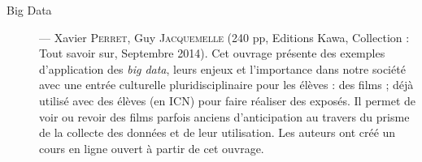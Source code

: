 \begin{description}
\item[Big Data] --- 
Xavier \textsc{Perret}, Guy \textsc{Jacquemelle} (240 pp, Editions Kawa, Collection : Tout savoir sur, Septembre 2014). Cet ouvrage présente des exemples d’application des \textit{big data}, leurs enjeux et l'importance dans notre société avec une entrée culturelle pluridisciplinaire pour les élèves : des films ; déjà utilisé avec des élèves (en ICN) pour faire réaliser des exposés. Il permet de voir ou revoir des films parfois anciens d’anticipation au travers du prisme de la collecte des données et de leur utilisation. Les auteurs ont créé un cours en ligne ouvert à partir de cet ouvrage.
\end{description}


\vfill\pagebreak\thispagestyle{empty}




























